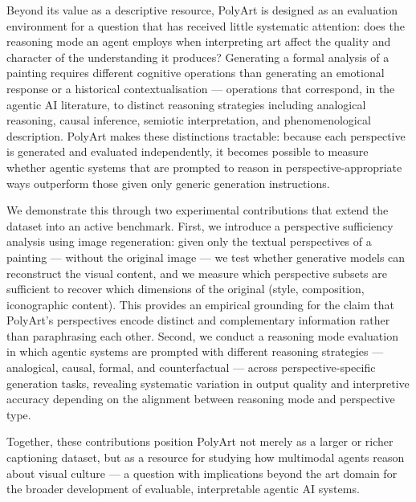 Beyond its value as a descriptive resource, PolyArt is designed as an evaluation environment for a question that has received little systematic attention: does the reasoning mode an agent employs when interpreting art affect the quality and character of the understanding it produces? Generating a formal analysis of a painting requires different cognitive operations than generating an emotional response or a historical contextualisation — operations that correspond, in the agentic AI literature, to distinct reasoning strategies including analogical reasoning, causal inference, semiotic interpretation, and phenomenological description. PolyArt makes these distinctions tractable: because each perspective is generated and evaluated independently, it becomes possible to measure whether agentic systems that are prompted to reason in perspective-appropriate ways outperform those given only generic generation instructions.

We demonstrate this through two experimental contributions that extend the dataset into an active benchmark. First, we introduce a perspective sufficiency analysis using image regeneration: given only the textual perspectives of a painting — without the original image — we test whether generative models can reconstruct the visual content, and we measure which perspective subsets are sufficient to recover which dimensions of the original (style, composition, iconographic content). This provides an empirical grounding for the claim that PolyArt's perspectives encode distinct and complementary information rather than paraphrasing each other. Second, we conduct a reasoning mode evaluation in which agentic systems are prompted with different reasoning strategies — analogical, causal, formal, and counterfactual — across perspective-specific generation tasks, revealing systematic variation in output quality and interpretive accuracy depending on the alignment between reasoning mode and perspective type.

Together, these contributions position PolyArt not merely as a larger or richer captioning dataset, but as a resource for studying how multimodal agents reason about visual culture — a question with implications beyond the art domain for the broader development of evaluable, interpretable agentic AI systems.


